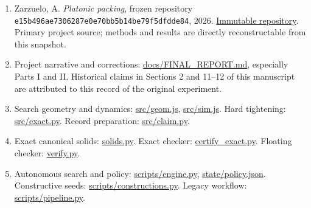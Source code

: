 \documentclass[11pt,a4paper]{article}
\begin{document}
\begin{enumerate}
\item Zarzuelo, A. \emph{Platonic packing}, frozen repository \nolinkurl{e15b496ae7306287e0e70bb5b14be79f5dfdde84}, 2026. \href{https://github.com/alejandrozu/platonic-packing/tree/e15b496ae7306287e0e70bb5b14be79f5dfdde84}{Immutable repository}. Primary project source; methods and results are directly reconstructable from this snapshot.
\item Project narrative and corrections: \href{https://github.com/alejandrozu/platonic-packing/blob/e15b496ae7306287e0e70bb5b14be79f5dfdde84/docs/FINAL\_REPORT.md}{docs/FINAL\_REPORT.md}, especially Parts I and II. Historical claims in Sections 2 and 11--12 of this manuscript are attributed to this record of the original experiment.
\item Search geometry and dynamics: \href{https://github.com/alejandrozu/platonic-packing/blob/e15b496ae7306287e0e70bb5b14be79f5dfdde84/src/geom.js}{src/geom.js}, \href{https://github.com/alejandrozu/platonic-packing/blob/e15b496ae7306287e0e70bb5b14be79f5dfdde84/src/sim.js}{src/sim.js}. Hard tightening: \href{https://github.com/alejandrozu/platonic-packing/blob/e15b496ae7306287e0e70bb5b14be79f5dfdde84/src/exact.py}{src/exact.py}. Record preparation: \href{https://github.com/alejandrozu/platonic-packing/blob/e15b496ae7306287e0e70bb5b14be79f5dfdde84/src/claim.py}{src/claim.py}.
\item Exact canonical solids: \href{https://github.com/alejandrozu/platonic-packing/blob/e15b496ae7306287e0e70bb5b14be79f5dfdde84/solids.py}{solids.py}. Exact checker: \href{https://github.com/alejandrozu/platonic-packing/blob/e15b496ae7306287e0e70bb5b14be79f5dfdde84/certify\_exact.py}{certify\_exact.py}. Floating checker: \href{https://github.com/alejandrozu/platonic-packing/blob/e15b496ae7306287e0e70bb5b14be79f5dfdde84/verify.py}{verify.py}.
\item Autonomous search and policy: \href{https://github.com/alejandrozu/platonic-packing/blob/e15b496ae7306287e0e70bb5b14be79f5dfdde84/scripts/engine.py}{scripts/engine.py}, \href{https://github.com/alejandrozu/platonic-packing/blob/e15b496ae7306287e0e70bb5b14be79f5dfdde84/state/policy.json}{state/policy.json}. Constructive seeds: \href{https://github.com/alejandrozu/platonic-packing/blob/e15b496ae7306287e0e70bb5b14be79f5dfdde84/scripts/constructions.py}{scripts/constructions.py}. Legacy workflow: \href{https://github.com/alejandrozu/platonic-packing/blob/e15b496ae7306287e0e70bb5b14be79f5dfdde84/scripts/pipeline.py}{scripts/pipeline.py}.

\end{enumerate}
\end{document}
